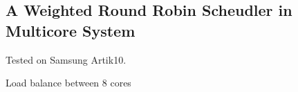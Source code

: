 \documentclass[letterpaper]{article}
\def\footerlink{http://github.com/alapha23/}
\renewenvironment{itemize}{
  \begin{list}{}{
    \setlength{\leftmargin}{1.5em}
  }
}{
  \end{list}
}
\begin{document}
\subsection*{A Weighted Round Robin Scheudler in Multicore System}
\begin{itemize}
	\item Tested on Samsung Artik10.
	\item Load balance between 8 cores
\end{itemize}


%
%

%

\bigskip

\end{document}
